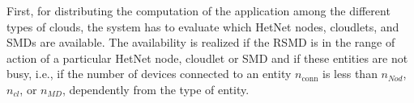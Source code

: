 \documentclass[twoside,openright]{report}
\newenvironment{boxedalgorithmic}
{\begin{lrbox}{\ieeealgbox}
\begin{minipage}{\dimexpr\columnwidth-2\fboxsep-2\fboxrule}
\begin{algorithmic}}
{\end{algorithmic}
\end{minipage}
\end{lrbox}\noindent\fbox{\usebox{\ieeealgbox}}}
\begin{document}
First, for distributing the computation of the application among the different types of clouds, the system has to evaluate which \gls{HetNet} nodes, cloudlets, and \glspl{SMD} are available. The availability is realized if the \gls{RSMD} is in the range of action of a particular \gls{HetNet} node, cloudlet or \gls{SMD} and if these entities are not busy, i.e., if the number of devices connected to an entity $n_\text{conn}$ is less than $n_\textit{Nod}$, $n_\textit{cl}$, or $n_\textit{MD}$, dependently from the type of entity.
%
%
\end{document}
